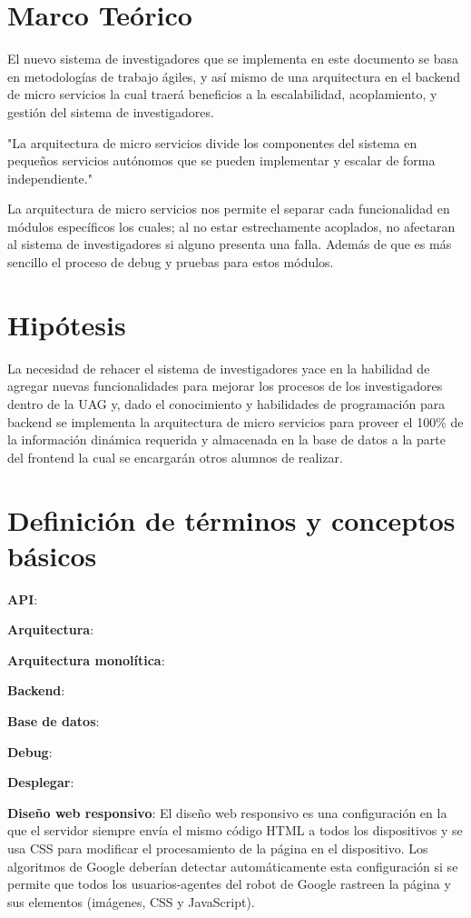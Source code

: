 \section{Marco Teórico}

    El nuevo sistema de investigadores que se implementa en este documento se basa en metodologías de trabajo ágiles, y así mismo de una arquitectura en el backend de micro servicios la cual traerá beneficios a la escalabilidad, acoplamiento, y gestión del sistema de investigadores.
    
    "La arquitectura de micro servicios divide los componentes del sistema en pequeños servicios autónomos que se pueden implementar y escalar de forma independiente."\cite{KryptonSolid}

    La arquitectura de micro servicios nos permite el separar cada funcionalidad en módulos específicos los cuales; al no estar estrechamente acoplados, no afectaran al sistema de investigadores si alguno presenta una falla. Además de que es más sencillo el proceso de debug y pruebas para estos módulos.

\section{Hipótesis}

    La necesidad de rehacer el sistema de investigadores yace en la habilidad de agregar nuevas funcionalidades para mejorar los procesos de los investigadores dentro de la UAG y, dado el conocimiento y habilidades de programación para backend se implementa la arquitectura de micro servicios para proveer el 100\% de la información dinámica requerida y almacenada en la base de datos a la parte del frontend la cual se encargarán otros alumnos de realizar.

\section{Definición de términos y conceptos básicos}

    \textbf{API}:

    \textbf{Arquitectura}: 
    
    \textbf{Arquitectura monolítica}:

    \textbf{Backend}:
    
    \textbf{Base de datos}:
    
    \textbf{Debug}:
    
    \textbf{Desplegar}: 
    
    \textbf{Diseño web responsivo}: El diseño web responsivo es una configuración en la que el servidor siempre envía el mismo código HTML a todos los dispositivos y se usa CSS para modificar el procesamiento de la página en el dispositivo. Los algoritmos de Google deberían detectar automáticamente esta configuración si se permite que todos los usuarios-agentes del robot de Google rastreen la página y sus elementos (imágenes, CSS y JavaScript). \cite{GoogleResponsivo}
    
